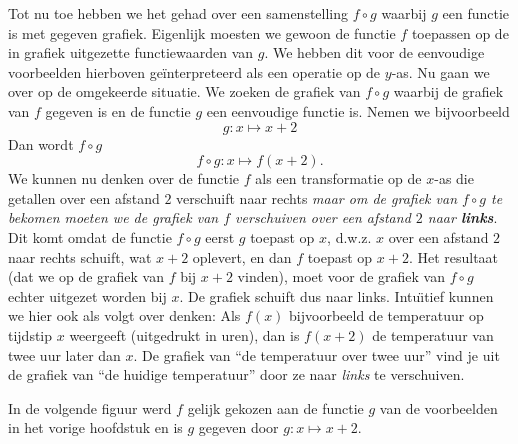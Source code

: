 \documentclass{ximera}
\begin{document}
Tot nu toe hebben we het gehad over een samenstelling $f\circ g$
waarbij $g$ een functie is met gegeven grafiek. Eigenlijk moesten we
gewoon de functie $f$ toepassen op de in grafiek uitgezette
functiewaarden van $g$. We hebben dit voor de eenvoudige voorbeelden
hierboven ge\"interpreteerd als een operatie op de $y$-as. Nu gaan we
over op de omgekeerde situatie. We zoeken de grafiek van
$f\circ g$ waarbij de grafiek van $f$ gegeven is en de functie $g$ een
eenvoudige functie is. Nemen we bijvoorbeeld
\[
g:x\mapsto x+2
\]
Dan wordt $f\circ g$
\[
f\circ g:x\mapsto f(x+2).
\]
We kunnen nu denken over de functie $f$ als een transformatie op de
$x$-as die getallen over een afstand $2$ verschuift naar rechts {\em
  maar om de grafiek van $f\circ g$ te bekomen moeten we de grafiek
  van $f$ verschuiven over een afstand $2$ naar {\bf links}}. Dit komt
omdat de functie $f\circ g$ eerst $g$ toepast op $x$, d.w.z. $x$ over
een afstand $2$ naar rechts schuift, wat $x+2$ oplevert, en dan $f$
toepast op $x+2$. Het resultaat (dat we op de grafiek van $f$ bij
$x+2$ vinden), moet voor de grafiek van $f\circ g$ echter uitgezet
worden bij $x$. De grafiek schuift dus naar links.  Intu\"\i tief
kunnen we hier ook als volgt over denken: Als $f(x)$ bijvoorbeeld de
temperatuur op tijdstip $x$ weergeeft (uitgedrukt in uren), dan is
$f(x+2)$ de temperatuur van twee uur later dan $x$. De grafiek van
``de temperatuur over twee uur'' vind je uit de grafiek van ``de
huidige temperatuur'' door ze naar {\em links} te verschuiven.

In de volgende figuur werd $f$ gelijk gekozen aan de functie $g$
van de voorbeelden in het vorige hoofdstuk en is $g$ gegeven door
$g:x\mapsto x+2$.

\begin{center}
\end{center}
\end{document}
